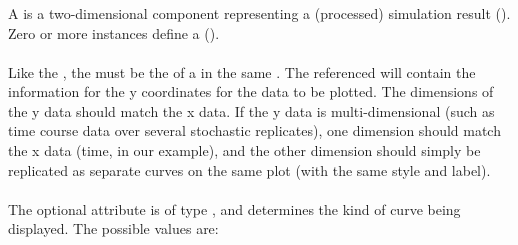 \subsubsection{}
\label{class:curve}
A \Curve is a two-dimensional \Output component representing a (processed) simulation result (). Zero or more \Curve instances define a \PlotTwo (). 

\begin{blockChanged}
\paragraph*{}
Like the , the  must be the  of a \DataGenerator in the same \SedDocument.  The referenced \DataGenerator will contain the information for the y coordinates for the data to be plotted.  The dimensions of the y data should match the x data.  If the y data is multi-dimensional (such as time course data over several stochastic replicates), one dimension should match the x data (time, in our example), and the other dimension should simply be replicated as separate curves on the same plot (with the same style and label).

\paragraph*{}
The optional  attribute is of type \CurveType, and determines the kind of curve being displayed.  The possible values are:


\end{blockChanged}
